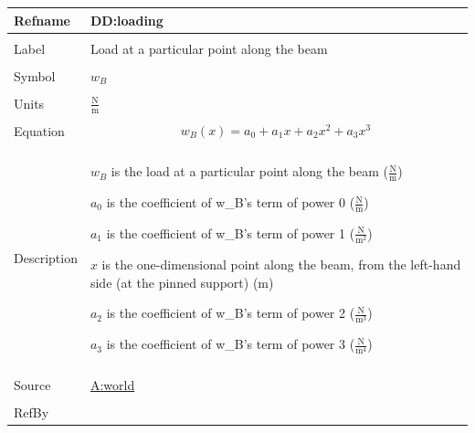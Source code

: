 \documentclass[12pt]{article}
\begin{document}
\vspace{\baselineskip}
\noindent
\begin{minipage}{\textwidth}
\begin{tabular}{>{\raggedright}p{}>{\raggedright\arraybackslash}p{}}
\toprule \textbf{Refname} & \textbf{DD:loading}
\label{DD:loading}
\\ \midrule \\
Label & Load at a particular point along the beam
        
\\ \midrule \\
Symbol & ${w_{B}}$
         
\\ \midrule \\
Units & $\frac{\text{N}}{\text{m}}$
        
\\ \midrule \\
Equation & \begin{displaymath}
           {w_{B}}\left(x\right)={a_{\text{0}}}+{a_{\text{1}}} x+{a_{\text{2}}} x^{2}+{a_{\text{3}}} x^{3}
           \end{displaymath}
\\ \midrule \\
Description & \begin{symbDescription}
              \item{${w_{B}}$ is the load at a particular point along the beam ($\frac{\text{N}}{\text{m}}$)}
              \item{${a_{\text{0}}}$ is the coefficient of w\_B's term of power 0 ($\frac{\text{N}}{\text{m}}$)}
              \item{${a_{\text{1}}}$ is the coefficient of w\_B's term of power 1 ($\frac{\text{N}}{\text{m}^{2}}$)}
              \item{$x$ is the one-dimensional point along the beam, from the left-hand side (at the pinned support) (${\text{m}}$)}
              \item{${a_{\text{2}}}$ is the coefficient of w\_B's term of power 2 ($\frac{\text{N}}{\text{m}^{3}}$)}
              \item{${a_{\text{3}}}$ is the coefficient of w\_B's term of power 3 ($\frac{\text{N}}{\text{m}^{4}}$)}
              \end{symbDescription}
\\ \midrule \\
Source & \hyperref[world]{A:world}
         
\\ \midrule \\
RefBy & 
\\ \bottomrule
\end{tabular}
\end{minipage}
\end{document}
